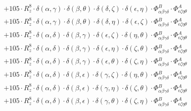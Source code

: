 \documentclass{article}
\begin{document}
\begin{equation}
\begin{array}{c}
 \\[0.2em] 		 + 105 \cdot R_{z}^{8} \cdot \delta{}\left(\alpha{}, \gamma{}\right) \cdot \delta{}\left(\beta{}, \theta{}\right) \cdot \delta{}\left(\delta{}, \zeta{}\right) \cdot \delta{}\left(\epsilon{}, \eta{}\right) \cdot \Phi{}^{B}_{\alpha{}\beta{}\gamma{}\delta{}} \cdot \Phi{}^{A}_{\epsilon{}\zeta{}\eta{}\theta{}} 
 \\[0.2em] 		 + 105 \cdot R_{z}^{8} \cdot \delta{}\left(\alpha{}, \gamma{}\right) \cdot \delta{}\left(\beta{}, \theta{}\right) \cdot \delta{}\left(\delta{}, \eta{}\right) \cdot \delta{}\left(\epsilon{}, \zeta{}\right) \cdot \Phi{}^{B}_{\alpha{}\beta{}\gamma{}\delta{}} \cdot \Phi{}^{A}_{\epsilon{}\zeta{}\eta{}\theta{}} 
 \\[0.2em] 		 + 105 \cdot R_{z}^{8} \cdot \delta{}\left(\alpha{}, \delta{}\right) \cdot \delta{}\left(\beta{}, \gamma{}\right) \cdot \delta{}\left(\epsilon{}, \zeta{}\right) \cdot \delta{}\left(\eta{}, \theta{}\right) \cdot \Phi{}^{B}_{\alpha{}\beta{}\gamma{}\delta{}} \cdot \Phi{}^{A}_{\epsilon{}\zeta{}\eta{}\theta{}} 
 \\[0.2em] 		 + 105 \cdot R_{z}^{8} \cdot \delta{}\left(\alpha{}, \delta{}\right) \cdot \delta{}\left(\beta{}, \gamma{}\right) \cdot \delta{}\left(\epsilon{}, \eta{}\right) \cdot \delta{}\left(\zeta{}, \theta{}\right) \cdot \Phi{}^{B}_{\alpha{}\beta{}\gamma{}\delta{}} \cdot \Phi{}^{A}_{\epsilon{}\zeta{}\eta{}\theta{}} 
 \\[0.2em] 		 + 105 \cdot R_{z}^{8} \cdot \delta{}\left(\alpha{}, \delta{}\right) \cdot \delta{}\left(\beta{}, \gamma{}\right) \cdot \delta{}\left(\epsilon{}, \theta{}\right) \cdot \delta{}\left(\zeta{}, \eta{}\right) \cdot \Phi{}^{B}_{\alpha{}\beta{}\gamma{}\delta{}} \cdot \Phi{}^{A}_{\epsilon{}\zeta{}\eta{}\theta{}} 
 \\[0.2em] 		 + 105 \cdot R_{z}^{8} \cdot \delta{}\left(\alpha{}, \delta{}\right) \cdot \delta{}\left(\beta{}, \epsilon{}\right) \cdot \delta{}\left(\gamma{}, \zeta{}\right) \cdot \delta{}\left(\eta{}, \theta{}\right) \cdot \Phi{}^{B}_{\alpha{}\beta{}\gamma{}\delta{}} \cdot \Phi{}^{A}_{\epsilon{}\zeta{}\eta{}\theta{}} 
 \\[0.2em] 		 + 105 \cdot R_{z}^{8} \cdot \delta{}\left(\alpha{}, \delta{}\right) \cdot \delta{}\left(\beta{}, \epsilon{}\right) \cdot \delta{}\left(\gamma{}, \eta{}\right) \cdot \delta{}\left(\zeta{}, \theta{}\right) \cdot \Phi{}^{B}_{\alpha{}\beta{}\gamma{}\delta{}} \cdot \Phi{}^{A}_{\epsilon{}\zeta{}\eta{}\theta{}} 
 \\[0.2em] 		 + 105 \cdot R_{z}^{8} \cdot \delta{}\left(\alpha{}, \delta{}\right) \cdot \delta{}\left(\beta{}, \epsilon{}\right) \cdot \delta{}\left(\gamma{}, \theta{}\right) \cdot \delta{}\left(\zeta{}, \eta{}\right) \cdot \Phi{}^{B}_{\alpha{}\beta{}\gamma{}\delta{}} \cdot \Phi{}^{A}_{\epsilon{}\zeta{}\eta{}\theta{}} 

\end{array}
\end{equation}
\end{document}
